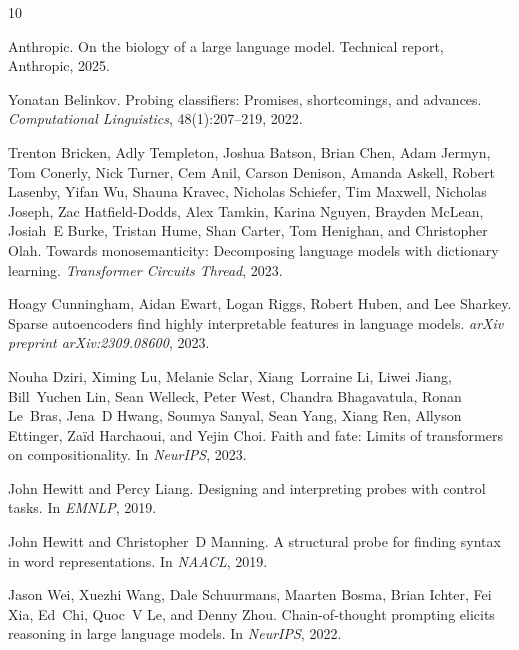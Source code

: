 \documentclass[10pt]{article}
\begin{document}
\begin{thebibliography}{10}

Anthropic.
\newblock On the biology of a large language model.
\newblock Technical report, Anthropic, 2025.

Yonatan Belinkov.
\newblock Probing classifiers: Promises, shortcomings, and advances.
\newblock \textit{Computational Linguistics}, 48(1):207--219, 2022.

Trenton Bricken, Adly Templeton, Joshua Batson, Brian Chen, Adam Jermyn, Tom Conerly, Nick Turner, Cem Anil, Carson Denison, Amanda Askell, Robert Lasenby, Yifan Wu, Shauna Kravec, Nicholas Schiefer, Tim Maxwell, Nicholas Joseph, Zac Hatfield-Dodds, Alex Tamkin, Karina Nguyen, Brayden McLean, Josiah~E Burke, Tristan Hume, Shan Carter, Tom Henighan, and Christopher Olah.
\newblock Towards monosemanticity: Decomposing language models with dictionary learning.
\newblock \textit{Transformer Circuits Thread}, 2023.

Hoagy Cunningham, Aidan Ewart, Logan Riggs, Robert Huben, and Lee Sharkey.
\newblock Sparse autoencoders find highly interpretable features in language models.
\newblock \textit{arXiv preprint arXiv:2309.08600}, 2023.

Nouha Dziri, Ximing Lu, Melanie Sclar, Xiang~Lorraine Li, Liwei Jiang, Bill~Yuchen Lin, Sean Welleck, Peter West, Chandra Bhagavatula, Ronan Le~Bras, Jena~D Hwang, Soumya Sanyal, Sean Yang, Xiang Ren, Allyson Ettinger, Za\"id Harchaoui, and Yejin Choi.
\newblock Faith and fate: Limits of transformers on compositionality.
\newblock In \textit{NeurIPS}, 2023.

John Hewitt and Percy Liang.
\newblock Designing and interpreting probes with control tasks.
\newblock In \textit{EMNLP}, 2019.

John Hewitt and Christopher~D Manning.
\newblock A structural probe for finding syntax in word representations.
\newblock In \textit{NAACL}, 2019.

Jason Wei, Xuezhi Wang, Dale Schuurmans, Maarten Bosma, Brian Ichter, Fei Xia, Ed~Chi, Quoc~V Le, and Denny Zhou.
\newblock Chain-of-thought prompting elicits reasoning in large language models.
\newblock In \textit{NeurIPS}, 2022.

\end{thebibliography}
\end{document}
